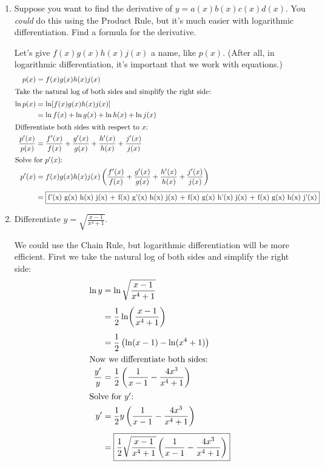 \documentclass[main]{subfiles}
\begin{document}
\begin{enumerate}[resume]
\item 
  \begin{problem}[\stretch{1}]
    Suppose you want to find the derivative of $y=a(x) b(x) c(x) d(x)$.
    You \emph{could} do this using the Product Rule, but it's much easier
    with logarithmic differentiation.  Find a formula for the derivative.
  \end{problem}

  \begin{solution}
    Let's give $f(x) g(x) h(x) j(x)$ a name, like $p(x)$.  (After all, in
    logarithmic differentiation, it's important that we work with
    equations.) 
    \begin{align*}
      p(x) &= f(x) g(x) h(x) j(x) \\
      \intertext{Take the natural log of both sides and simplify the
        right side:}
      \ln p(x) &= \ln [f(x) g(x) h(x) j(x)] \\
      &= \ln f(x) + \ln g(x) + \ln h(x) + \ln j(x) \\
      \intertext{Differentiate both sides with respect to $x$:}
      \frac{p'(x)}{p(x)} &= \frac{f'(x)}{f(x)} + \frac{g'(x)}{g(x)} +
      \frac{h'(x)}{h(x)} + \frac{j'(x)}{j(x)} \\
      \shortintertext{Solve for $p'(x)$:}
      p'(x) &= f(x) g(x) h(x) j(x) \left( \frac{f'(x)}{f(x)} + \frac{g'(x)}{g(x)} +
        \frac{h'(x)}{h(x)} + \frac{j'(x)}{j(x)} \right) \\[4pt]
      &= \fbox{f'(x) g(x) h(x) j(x) + f(x) g'(x) h(x) j(x) + f(x) g(x) h'(x) j(x)
      + f(x) g(x) h(x) j'(x)}  
    \end{align*}
  \end{solution}

\item 
\begin{problem}
    Differentiate $\displaystyle y=\sqrt{\frac{x-1}{x^4+1}}$.
\end{problem}
\pspace{\vfill}

\begin{solution}
    We could use the Chain Rule, but logarithmic differentiation will be more efficient. First we take the natural log of both sides and simplify the right side:
    \begin{align*}
        \ln y &= \ln\sqrt{\frac{x-1}{x^4+1}} \\[4pt]
        &= \frac{1}{2}\ln\!\left(\frac{x-1}{x^4+1}\right) \\[4pt]
        &= \frac{1}{2}\left(\ln(x-1)-\ln(x^4+1)\right)\\
        \intertext{Now we differentiate both sides:}
        \frac{y'}{y} &= \frac{1}{2}\left(\frac{1}{x-1} - \frac{4x^3}{x^4+1}\right)\\
        \intertext{Solve for $y'$:}
        y' &= \frac{1}{2}y\left(\frac{1}{x-1} - \frac{4x^3}{x^4+1}\right)\\[4pt]
        &= \fbox{$\displaystyle\frac{1}{2}\sqrt{\frac{x-1}{x^4+1}}\left(\frac{1}{x-1} - \frac{4x^3}{x^4+1}\right)$}
    \end{align*}
\end{solution}


\end{enumerate}
\end{document}
